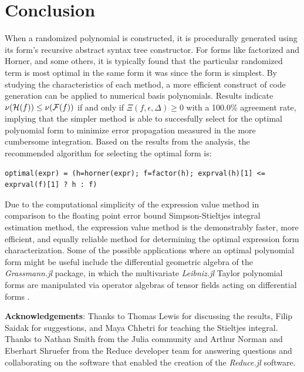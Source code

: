 \documentclass[]{elsarticle}
\begin{document}
\newpage
\section{Conclusion}
When a randomized polynomial is constructed, it is procedurally generated using its form's recursive abstract syntax tree constructor. For forms like factorized and Horner, and some others, it is typically found that the particular randomized term is most optimal in the same form it was  since the form is simplest.
By studying the characteristics of each method, a more efficient construct of code generation can be applied to numerical basis polynomials.
Results indicate $\nu(\mathcal{H}(f)) \leq \nu(\mathcal{F}(f))$ if and only if $\Xi(f,\epsilon,\Delta)\geq0$ with a 100.0\% agreement rate,
 implying that the simpler method is able to succesfully select for the optimal polynomial form to minimize error propagation measured in the more cumbersome integration.
Based on the results from the analysis, the recommended algorithm for selecting the optimal form is:
\begin{verbatim}
optimal(expr) = (h=horner(expr); f=factor(h); exprval(h)[1] <= exprval(f)[1] ? h : f)
\end{verbatim}
Due to the computational simplicity of the expression value method in comparison to the floating point error bound Simpson-Stieltjes integral estimation method, the expression value method is the demonstrably faster, more efficient, and equally reliable method for determining the optimal expression form characterization.
Some of the possible applications where an optimal polynomial form might be useful include the differential geometric algebra of the \textit{Grassmann.jl} package, in which the multivariate \textit{Leibniz.jl} Taylor polynomial forms are manipulated via operator algebras of tensor fields acting on differential forms \cite{grassmann-juliacon-2019}.


\textbf{Acknowledgements}:
Thanks to Thomas Lewis for discussing the results, Filip Saidak for suggestions,  and Maya Chhetri for teaching the Stieltjes integral.
Thanks to Nathan Smith from the Julia community and Arthur Norman and Eberhart Shruefer from the Reduce developer team for answering questions and collaborating on the software that enabled the creation of the \textit{Reduce.jl} software.
\end{document}
